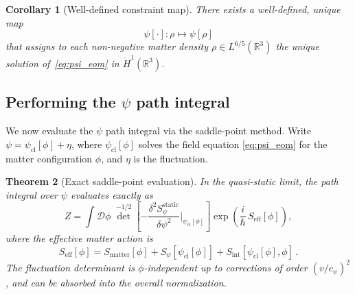 \documentclass[12pt,a4paper]{article}
\newtheorem{theorem}{Theorem}
\newtheorem{corollary}[theorem]{Corollary}
\theoremstyle{definition}
\theoremstyle{remark}
\newcommand{\hbar}{\hslash}
\newcommand{\Dpath}{\mathcal{D}}
\begin{document}
\begin{corollary}[Well-defined constraint map]
\label{cor:constraint_map}
There exists a well-defined, unique map
\begin{equation}
\label{eq:constraint_map}
\psi[\cdot]: \rho \mapsto \psi[\rho]
\end{equation}
that assigns to each non-negative matter density $\rho \in L^{6/5}(\mathbb{R}^3)$
the unique solution of~\eqref{eq:psi_eom} in $\dot{H}^1(\mathbb{R}^3)$.
\end{corollary}

\subsection{Performing the $\psi$ path integral}

We now evaluate the $\psi$ path integral via the saddle-point method.  Write
$\psi = \psi_{\mathrm{cl}}[\phi] + \eta$, where $\psi_{\mathrm{cl}}[\phi]$ solves
the field equation \eqref{eq:psi_eom} for the matter configuration $\phi$,
and $\eta$ is the fluctuation.

\begin{theorem}[Exact saddle-point evaluation]
\label{thm:saddle}
In the quasi-static limit, the path integral over $\psi$ evaluates exactly as
\begin{equation}
\label{eq:Z_eff}
Z = \int \Dpath\phi\;\det^{-1/2}\!\left[-\frac{\delta^2 S_\psi^{\mathrm{static}}}
{\delta\psi^2}\bigg|_{\psi_{\mathrm{cl}}[\phi]}\right]
\exp\!\left(\frac{i}{\hbar}\,S_{\mathrm{eff}}[\phi]\right),
\end{equation}
where the effective matter action is
\begin{equation}
\label{eq:S_eff}
S_{\mathrm{eff}}[\phi] = S_{\mathrm{matter}}[\phi] + S_\psi[\psi_{\mathrm{cl}}[\phi]]
+ S_{\mathrm{int}}[\psi_{\mathrm{cl}}[\phi], \phi]\,.
\end{equation}
The fluctuation determinant is $\phi$-independent up to corrections of order
$(v/c_\psi)^2$, and can be absorbed into the overall normalization.
\end{theorem}
\end{document}
